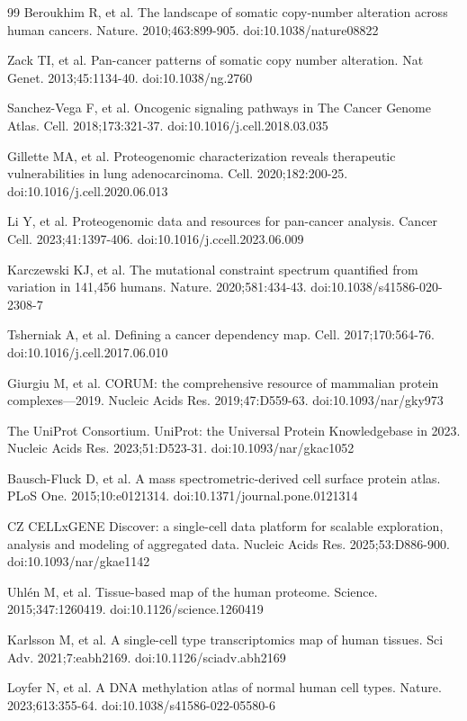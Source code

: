 \documentclass[times, twoside]{zHenriquesLab-StyleBioRxiv}
\begin{document}
\begin{thebibliography}{99}
 Beroukhim R, et al. The landscape of somatic copy-number alteration across human cancers. Nature. 2010;463:899-905. doi:10.1038/nature08822

 Zack TI, et al. Pan-cancer patterns of somatic copy number alteration. Nat Genet. 2013;45:1134-40. doi:10.1038/ng.2760

 Sanchez-Vega F, et al. Oncogenic signaling pathways in The Cancer Genome Atlas. Cell. 2018;173:321-37. doi:10.1016/j.cell.2018.03.035

 Gillette MA, et al. Proteogenomic characterization reveals therapeutic vulnerabilities in lung adenocarcinoma. Cell. 2020;182:200-25. doi:10.1016/j.cell.2020.06.013

 Li Y, et al. Proteogenomic data and resources for pan-cancer analysis. Cancer Cell. 2023;41:1397-406. doi:10.1016/j.ccell.2023.06.009

 Karczewski KJ, et al. The mutational constraint spectrum quantified from variation in 141,456 humans. Nature. 2020;581:434-43. doi:10.1038/s41586-020-2308-7

 Tsherniak A, et al. Defining a cancer dependency map. Cell. 2017;170:564-76. doi:10.1016/j.cell.2017.06.010

 Giurgiu M, et al. CORUM: the comprehensive resource of mammalian protein complexes---2019. Nucleic Acids Res. 2019;47:D559-63. doi:10.1093/nar/gky973

 The UniProt Consortium. UniProt: the Universal Protein Knowledgebase in 2023. Nucleic Acids Res. 2023;51:D523-31. doi:10.1093/nar/gkac1052

 Bausch-Fluck D, et al. A mass spectrometric-derived cell surface protein atlas. PLoS One. 2015;10:e0121314. doi:10.1371/journal.pone.0121314

 CZ CELLxGENE Discover: a single-cell data platform for scalable exploration, analysis and modeling of aggregated data. Nucleic Acids Res. 2025;53:D886-900. doi:10.1093/nar/gkae1142

 Uhl\'en M, et al. Tissue-based map of the human proteome. Science. 2015;347:1260419. doi:10.1126/science.1260419

 Karlsson M, et al. A single-cell type transcriptomics map of human tissues. Sci Adv. 2021;7:eabh2169. doi:10.1126/sciadv.abh2169

 Loyfer N, et al. A DNA methylation atlas of normal human cell types. Nature. 2023;613:355-64. doi:10.1038/s41586-022-05580-6


\end{thebibliography}
\end{document}
